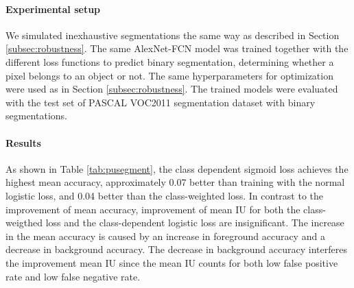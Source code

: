 \paragraph{Experimental setup}
We simulated inexhaustive segmentations the same way as described in Section \ref{subsec:robustness}.
The same AlexNet-FCN model was trained together with the different loss functions to predict binary segmentation, determining whether a pixel belongs to an object or not.
The same hyperparameters for optimization were used as in Section \ref{subsec:robustness}.
The trained models were evaluated with the test set of PASCAL VOC2011 segmentation dataset with binary segmentations.


\paragraph{Results}
As shown in Table \ref{tab:pusegment}, the class dependent sigmoid loss achieves the highest mean accuracy, approximately 0.07 better than training with the normal logistic loss, and 0.04 better than the class-weighted loss.
In contrast to the improvement of mean accuracy, improvement of mean IU for both the class-weigthed loss and the class-dependent logistic loss are insignificant.
The increase in the mean accuracy is caused by an increase in foreground accuracy and a decrease in background accuracy.
The decrease in background accuracy interferes the improvement mean IU since the mean IU counts for both low false positive rate and low false negative rate.


